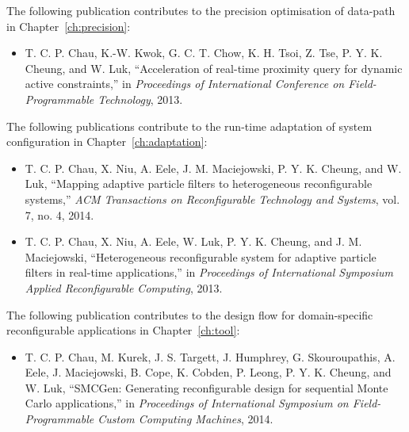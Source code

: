 
\cleardoublepage

{}

\begin{publications}

%

The following publication contributes to the precision optimisation of data-path in Chapter~\ref{ch:precision}:
\begin{itemize}
\item T. C. P. Chau, K.-W. Kwok, G. C. T. Chow, K. H. Tsoi, Z. Tse, P. Y. K. Cheung, and W. Luk, ``Acceleration of real-time proximity query for dynamic active constraints,'' in \textit{Proceedings of International Conference on Field-Programmable Technology}, 2013.%
\end{itemize}

The following publications contribute to the run-time adaptation of system configuration in Chapter~\ref{ch:adaptation}:
\begin{itemize}
\item T. C. P. Chau, X. Niu, A. Eele, J. M. Maciejowski, P. Y. K. Cheung, and W. Luk, ``Mapping adaptive particle filters to heterogeneous reconﬁgurable systems,'' \textit{ACM Transactions on Reconﬁgurable Technology and Systems}, vol. 7, no. 4, 2014.
\item T. C. P. Chau, X. Niu, A. Eele, W. Luk, P. Y. K. Cheung, and J. M. Maciejowski, ``Heterogeneous reconfigurable system for adaptive particle filters in real-time applications,'' in \textit{Proceedings of International Symposium Applied Reconfigurable Computing}, 2013.%
\end{itemize}

The following publication contributes to the design flow for domain-specific reconfigurable applications in Chapter~\ref{ch:tool}:
\begin{itemize}
\item T. C. P. Chau, M. Kurek, J. S. Targett, J. Humphrey, G. Skouroupathis, A. Eele, J. Maciejowski, B. Cope, K. Cobden, P. Leong, P. Y. K. Cheung, and W. Luk, ``SMCGen: Generating reconfigurable design for sequential Monte Carlo applications,'' in \textit{Proceedings of International Symposium on Field-Programmable Custom Computing Machines}, 2014.%
\end{itemize}


\end{publications}
